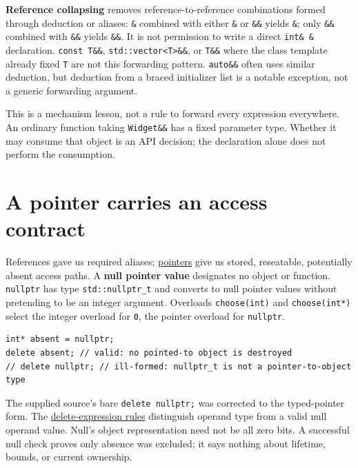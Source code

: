 \textbf{Reference collapsing} removes reference-to-reference combinations formed through deduction or aliases: \texttt{\&} combined with either \texttt{\&} or \texttt{\&\&} yields \texttt{\&}; only \texttt{\&\&} combined with \texttt{\&\&} yields \texttt{\&\&}. It is not permission to write a direct \texttt{int\&\ \&} declaration. \texttt{const\ T\&\&}, \texttt{std::vector\textless{}T\textgreater{}\&\&}, or \texttt{T\&\&} where the class template already fixed \texttt{T} are not this forwarding pattern. \texttt{auto\&\&} often uses similar deduction, but deduction from a braced initializer list is a notable exception, not a generic forwarding argument.

This is a mechanism lesson, not a rule to forward every expression everywhere. An ordinary function taking \texttt{Widget\&\&} has a fixed parameter type. Whether it may consume that object is an API decision; the declaration alone does not perform the consumption.

\section{A pointer carries an access contract}\label{01-foundations-i-ch003-a-pointer-carries-an-access-contract}

\hypertarget{01-foundations-i-ch003-a-pointer-carries-an-access-contract}{}

References gave us required aliases; \hyperref[appendix-afae48c31800]{pointers} give us stored, reseatable, potentially absent access paths. A \textbf{null pointer value} designates no object or function. \texttt{nullptr} has type \texttt{std::nullptr\_t} and converts to null pointer values without pretending to be an integer argument. Overloads \texttt{choose(int)} and \texttt{choose(int*)} select the integer overload for \texttt{0}, the pointer overload for \texttt{nullptr}.

\begin{verbatim}
int* absent = nullptr;
delete absent; // valid: no pointed-to object is destroyed
// delete nullptr; // ill-formed: nullptr_t is not a pointer-to-object type
\end{verbatim}

The supplied source's bare \texttt{delete\ nullptr;} was corrected to the typed-pointer form. The \href{https://eel.is/c++draft/expr.delete}{delete-expression rules} distinguish operand type from a valid null operand value. Null's object representation need not be all zero bits. A successful null check proves only absence was excluded; it says nothing about lifetime, bounds, or current ownership.

